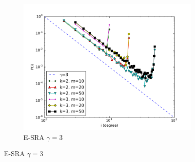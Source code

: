 \begin{figure}[!t]
\begin{subfigure}{.3\textwidth}
\includegraphics[width=.99\linewidth]{img/chap2/remove30.pdf}
\caption{E-SRA $ \gamma=3$}\label{fig:remove30}
\end{subfigure} %
\hfill


\end{figure}
